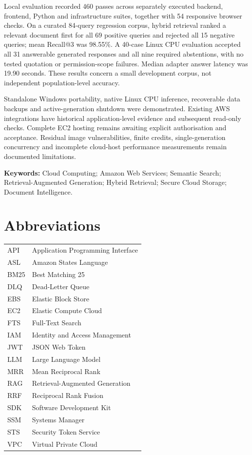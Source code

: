 \documentclass[11pt,a4paper,oneside]{report}
\begin{document}
Local evaluation recorded 460 passes across separately executed backend, frontend, Python and infrastructure suites, together with 54 responsive browser checks. On a curated 84-query regression corpus, hybrid retrieval ranked a relevant document first for all 69 positive queries and rejected all 15 negative queries; mean Recall@3 was 98.55\%. A 40-case Linux CPU evaluation accepted all 31 answerable generated responses and all nine required abstentions, with no tested quotation or permission-scope failures. Median adapter answer latency was 19.90 seconds. These results concern a small development corpus, not independent population-level accuracy.

Standalone Windows portability, native Linux CPU inference, recoverable data backups and active-generation shutdown were demonstrated. Existing AWS integrations have historical application-level evidence and subsequent read-only checks. Complete EC2 hosting remains awaiting explicit authorisation and acceptance. Residual image vulnerabilities, finite credits, single-generation concurrency and incomplete cloud-host performance measurements remain documented limitations.

\textbf{Keywords:} Cloud Computing; Amazon Web Services; Semantic Search; Retrieval-Augmented Generation; Hybrid Retrieval; Secure Cloud Storage; Document Intelligence.
\begingroup\setcounter{tocdepth}{0}\tableofcontents\endgroup
\setcounter{tocdepth}{1}\listoffigures\listoftables
\chapter*{Abbreviations}
\begin{tabularx}{\linewidth}{lY}\toprule API&Application Programming Interface\\ASL&Amazon States Language\\BM25&Best Matching 25\\DLQ&Dead-Letter Queue\\EBS&Elastic Block Store\\EC2&Elastic Compute Cloud\\FTS&Full-Text Search\\IAM&Identity and Access Management\\JWT&JSON Web Token\\LLM&Large Language Model\\MRR&Mean Reciprocal Rank\\RAG&Retrieval-Augmented Generation\\RRF&Reciprocal Rank Fusion\\SDK&Software Development Kit\\SSM&Systems Manager\\STS&Security Token Service\\VPC&Virtual Private Cloud\\\bottomrule\end{tabularx}
\clearpage{}
\end{document}
